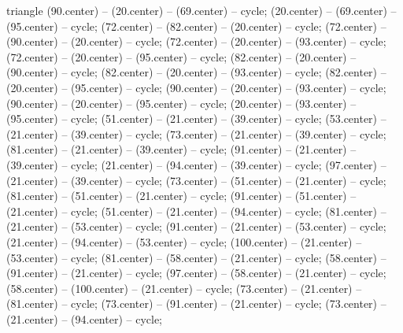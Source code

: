 \begin{pgfonlayer}{triangle}
 (90.center) -- (20.center) -- (69.center) -- cycle; 
 (20.center) -- (69.center) -- (95.center) -- cycle; 
 (72.center) -- (82.center) -- (20.center) -- cycle; 
 (72.center) -- (90.center) -- (20.center) -- cycle; 
 (72.center) -- (20.center) -- (93.center) -- cycle; 
 (72.center) -- (20.center) -- (95.center) -- cycle; 
 (82.center) -- (20.center) -- (90.center) -- cycle; 
 (82.center) -- (20.center) -- (93.center) -- cycle; 
 (82.center) -- (20.center) -- (95.center) -- cycle; 
 (90.center) -- (20.center) -- (93.center) -- cycle; 
 (90.center) -- (20.center) -- (95.center) -- cycle; 
 (20.center) -- (93.center) -- (95.center) -- cycle; 
 (51.center) -- (21.center) -- (39.center) -- cycle; 
 (53.center) -- (21.center) -- (39.center) -- cycle; 
 (73.center) -- (21.center) -- (39.center) -- cycle; 
 (81.center) -- (21.center) -- (39.center) -- cycle; 
 (91.center) -- (21.center) -- (39.center) -- cycle; 
 (21.center) -- (94.center) -- (39.center) -- cycle; 
 (97.center) -- (21.center) -- (39.center) -- cycle; 
 (73.center) -- (51.center) -- (21.center) -- cycle; 
 (81.center) -- (51.center) -- (21.center) -- cycle; 
 (91.center) -- (51.center) -- (21.center) -- cycle; 
 (51.center) -- (21.center) -- (94.center) -- cycle; 
 (81.center) -- (21.center) -- (53.center) -- cycle; 
 (91.center) -- (21.center) -- (53.center) -- cycle; 
 (21.center) -- (94.center) -- (53.center) -- cycle; 
 (100.center) -- (21.center) -- (53.center) -- cycle; 
 (81.center) -- (58.center) -- (21.center) -- cycle; 
 (58.center) -- (91.center) -- (21.center) -- cycle; 
 (97.center) -- (58.center) -- (21.center) -- cycle; 
 (58.center) -- (100.center) -- (21.center) -- cycle; 
 (73.center) -- (21.center) -- (81.center) -- cycle; 
 (73.center) -- (91.center) -- (21.center) -- cycle; 
 (73.center) -- (21.center) -- (94.center) -- cycle; 

\end{pgfonlayer}

